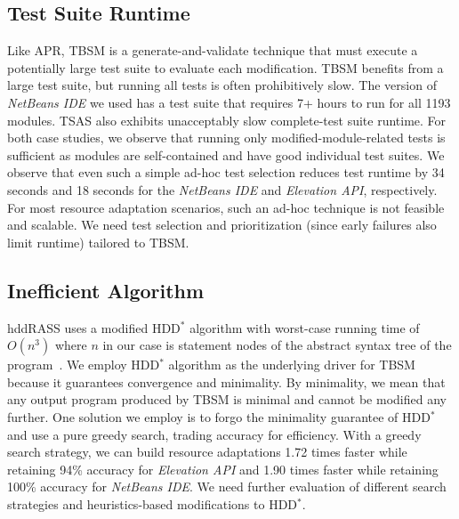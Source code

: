 \subsection{Test Suite Runtime }
Like APR, TBSM is a generate-and-validate technique that must execute a potentially large test suite to evaluate each modification. TBSM benefits from a large test suite, but running all tests is often prohibitively slow. The version of \textit{NetBeans IDE} we used has a test suite that requires 7+ hours to run for all 1193 modules. TSAS also exhibits unacceptably slow complete-test suite runtime. For both case studies, we observe that running only modified-module-related tests is sufficient as modules are self-contained and have good individual test suites. We observe that even such a simple ad-hoc test selection reduces test runtime by 34 seconds and 18 seconds for the \textit{NetBeans IDE} and \textit{Elevation API}, respectively. For most resource adaptation scenarios, such an ad-hoc technique is not feasible and scalable. We need test selection and prioritization (since early failures also limit runtime) tailored to TBSM.  

\subsection{Inefficient Algorithm}
hddRASS uses a modified HDD$^*$ algorithm with worst-case running time of $O(n^3)$ where $n$ in our case is statement nodes of the abstract syntax tree of the program~\cite{misherghi2006hdd}. We employ HDD$^*$ algorithm as the underlying driver for TBSM because it guarantees convergence and minimality. By minimality, we mean that any output program produced by TBSM is minimal and cannot be modified any further. One solution we employ is to forgo the minimality guarantee of HDD$^*$ and use a pure greedy search, trading accuracy for efficiency.  With a greedy search strategy, we can build resource adaptations 1.72 times faster while retaining 94\% accuracy for \textit{Elevation API} and 1.90 times faster while retaining 100\% accuracy for \textit{NetBeans IDE}. We need further evaluation of different search strategies and heuristics-based modifications to HDD$^*$.

